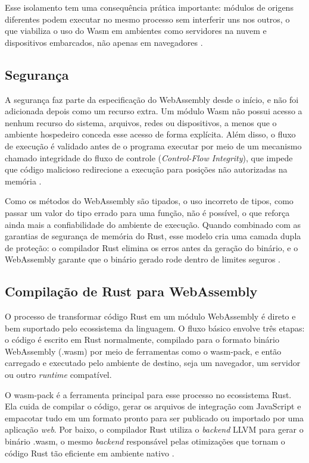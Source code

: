 Esse isolamento tem uma consequência prática importante: módulos de origens diferentes podem executar no mesmo processo sem interferir uns nos outros, o que viabiliza o uso do Wasm em ambientes como servidores na nuvem e dispositivos embarcados, não apenas em navegadores \cite{moric2022}.

\subsection{Segurança}

A segurança faz parte da especificação do WebAssembly desde o início, e não foi adicionada depois como um recurso extra. Um módulo Wasm não possui acesso a nenhum recurso do sistema, arquivos, redes ou dispositivos, a menos que o ambiente hospedeiro conceda esse acesso de forma explícita. Além disso, o fluxo de execução é validado antes de o programa executar por meio de um mecanismo chamado integridade do fluxo de controle (\emph{Control-Flow Integrity}), que impede que código malicioso redirecione a execução para posições não autorizadas na memória \cite{moric2022}.

Como os métodos do WebAssembly são tipados, o uso incorreto de tipos, como passar um valor do tipo errado para uma função, não é possível, o que reforça ainda mais a confiabilidade do ambiente de execução. Quando combinado com as garantias de segurança de memória do Rust, esse modelo cria uma camada dupla de proteção: o compilador Rust elimina os erros antes da geração do binário, e o WebAssembly garante que o binário gerado rode dentro de limites seguros \cite{moric2022}.

\subsection{Compilação de Rust para WebAssembly}

O processo de transformar código Rust em um módulo WebAssembly é direto e bem suportado pelo ecossistema da linguagem. O fluxo básico envolve três etapas: o código é escrito em Rust normalmente, compilado para o formato binário WebAssembly (.wasm) por meio de ferramentas como o wasm-pack, e então carregado e executado pelo ambiente de destino, seja um navegador, um servidor ou outro \emph{runtime} compatível.

O wasm-pack é a ferramenta principal para esse processo no ecossistema Rust. Ela cuida de compilar o código, gerar os arquivos de integração com JavaScript e empacotar tudo em um formato pronto para ser publicado ou importado por uma aplicação \emph{web}. Por baixo, o compilador Rust utiliza o \emph{backend} LLVM para gerar o binário .wasm, o mesmo \emph{backend} responsável pelas otimizações que tornam o código Rust tão eficiente em ambiente nativo \cite{moric2022}.

